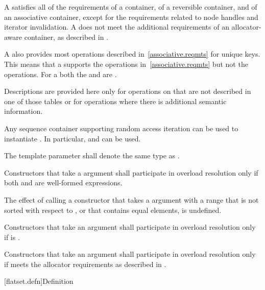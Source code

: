\begin{codeblock}
\begin{codeblock}
\begin{codeblock}
\begin{addedblock}
\pnum
A  satisfies all of the requirements of a container, of a
reversible container, and of an associative
container, except for the requirements related to
node handles and iterator
invalidation.  A  does not
meet the additional requirements of an allocator-aware container, as described
in .

\pnum
A  also provides most operations described
in~\ref{associative.reqmts} for unique keys.  This means that a
 supports the  operations
in~\ref{associative.reqmts} but not the  operations.  For a
 both the  and  are
.

\pnum
Descriptions are provided here only for operations on  that
are not described in one of those tables or for operations where there is
additional semantic information.

\pnum
Any sequence container supporting random access iteration can be used to
instantiate . In particular,  and
 can be used.

\pnum
The template parameter  shall denote the same type as
.

\pnum
Constructors that take a  argument  shall
participate in overload resolution only if both  and
 are well-formed expressions.

\pnum
The effect of calling a constructor that takes a 
argument with a range that is not sorted with respect to , or
that contains equal elements, is undefined.

\pnum
Constructors that take an  argument shall participate in overload
resolution only if  is
.

\pnum
Constructors that take an  argument shall participate in overload
resolution only if  meets the allocator requirements as described
in .

[flatset.defn]{Definition}


\end{addedblock}
\end{codeblock}
\end{codeblock}
\end{codeblock}

